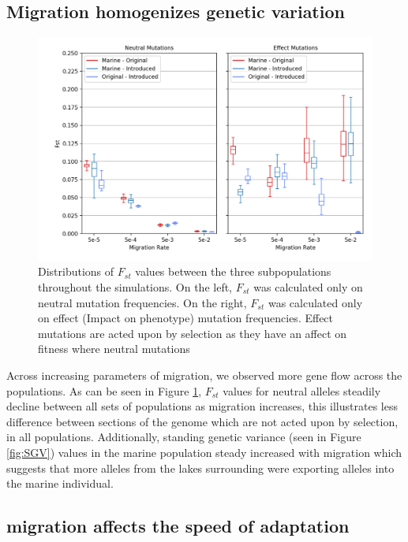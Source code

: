 \documentclass{article}
\begin{document}
\subsection*{Migration homogenizes genetic variation}


\begin{figure}
	\begin{center}
  		\includegraphics[width=0.8\linewidth]{matplotlibPlots/FST_HRR.png}
  		\caption{Distributions of $F_{st}$  values between the three subpopulations throughout the simulations.
		On the left, $F_{st}$ was calculated only on neutral mutation frequencies. On the right, $F_{st}$ was calculated
		only on effect (Impact on phenotype) mutation frequencies. 
		Effect mutations are acted upon by selection as they have an affect on fitness where neutral mutations  }
  		\label{fig:Fst}
	\end{center}
\end{figure}

Across increasing parameters of migration, we observed more gene flow across the populations. 
As can be seen in Figure \ref{fig:Fst},
$F_{st}$ values for neutral alleles steadily decline between all sets of populations as 
migration increases, this illustrates less difference between sections of the genome which are not acted
upon by selection, in all populations.
Additionally, standing genetic variance
(seen in Figure \ref{fig:SGV})
values in the marine population steady increased with migration which suggests that more alleles from the 
lakes surrounding were exporting alleles into the marine individual.


\subsection*{migration affects the speed of adaptation}
\end{document}
